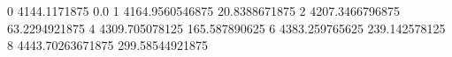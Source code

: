 0 4144.1171875 0.0
1 4164.9560546875 20.8388671875
2 4207.3466796875 63.2294921875
4 4309.705078125 165.587890625
6 4383.259765625 239.142578125
8 4443.70263671875 299.58544921875

